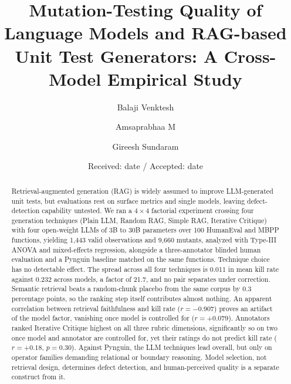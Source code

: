 \documentclass[smallextended]{svjour3}
\begin{document}
\title{Mutation-Testing Quality of Language Models and RAG-based
Unit Test Generators: A Cross-Model Empirical Study}

\author{Balaji Venktesh \and
        Amsaprabhaa M \and
        Gireesh Sundaram}


\date{Received: date / Accepted: date}

\maketitle

\begin{abstract}
Retrieval-augmented generation (RAG) is widely assumed to improve
LLM-generated unit tests, but evaluations rest on surface metrics and
single models, leaving defect-detection capability untested. We ran a
$4 \times 4$ factorial experiment crossing four generation techniques
(Plain LLM, Random RAG, Simple RAG, Iterative Critique) with four
open-weight LLMs of 3B to 30B parameters over 100 HumanEval and MBPP
functions, yielding 1,443 valid observations and 9,660 mutants,
analyzed with Type-III ANOVA and mixed-effects regression, alongside a
three-annotator blinded human evaluation and a Pynguin baseline
matched on the same functions. Technique choice has no detectable
effect. The spread across all four techniques is 0.011 in mean kill
rate against 0.232 across models, a factor of 21.7, and no pair
separates under correction. Semantic retrieval beats a random-chunk
placebo from the same corpus by 0.3 percentage points, so the ranking
step itself contributes almost nothing. An apparent correlation
between retrieval faithfulness and kill rate ($r = -0.907$) proves an
artifact of the model factor, vanishing once model is controlled for
($r = +0.079$). Annotators ranked Iterative Critique highest on all
three rubric dimensions, significantly so on two once model and
annotator are controlled for, yet their ratings do not predict kill
rate ($r = +0.18$, $p = 0.30$). Against Pynguin, the LLM techniques
lead overall, but only on operator families demanding relational or
boundary reasoning. Model selection, not retrieval design, determines
defect detection, and human-perceived quality is a separate construct
from it.
\end{abstract}
\end{document}
